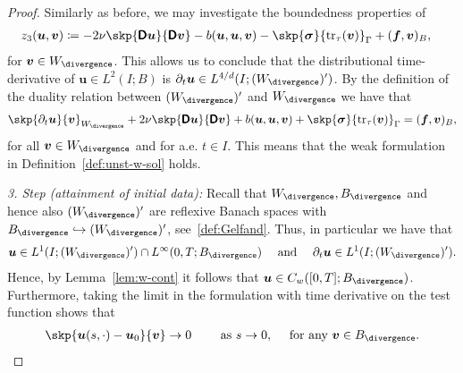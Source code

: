 \documentclass[reqno,a4paper]{amsart}
\def\tens#1{\pmb{\mathsf{#1}}}
\def\vec#1{\boldsymbol{#1}}
\def\tr{\mathop{\mathrm{tr}}\nolimits}
\def\Bdiv{{B_{\divergence}}}
\def\Wdiv{{W_{\divergence}}}
\def\bf{\vec{f}}
\def\bu{\vec{u}}
\def\bv{\vec{v}}
\def\bsigma{\vec{\sigma}}
\def\BD{\tens{D}}
\def\yz{{z_3}}
\begin{document}
\begin{proof}
	Similarly as before, we may investigate the boundedness properties of 
	\begin{equation}
		\begin{aligned}\label{def:z-form-v}
			\yz(\bu, \bv) &\coloneqq 
			- 2\nu \skp{ \BD \bu}{ \BD \bv } 
			- {b}(\bu, \bu, \bv)
			- \skp{\bsigma}{\tr_{\tau}(\bv) }_{\Gamma}
			+ ({\bf} ,{\bv} )_B,
		\end{aligned}
	\end{equation}
	for $\bv \in \Wdiv$. 
	This allows us to conclude that the distributional time-derivative  of $\bu \in L^2(I;B)$ is $\partial_t \bu \in L^{4/d}(I;(\Wdiv)')$. 
	By the definition of the duality relation between $(\Wdiv)'$ and $\Wdiv$ we have that 
	\begin{equation}\label{eq:unst-lim-weak-1}
		\begin{aligned}
			\skp{\partial_t  \bu}{ \bv}_{\Wdiv} 
			+ 2 \nu \skp{\BD \bu}{ \BD \bv}   
			+  b(\bu,\bu,\bv)  
			+  \skp{
				\bsigma
			}{\tr_\tau(\bv)}_{\Gamma}  =  ( \bf, {\bv})_B,
		\end{aligned}
	\end{equation} 
	for all $\bv \in \Wdiv$ and for a.e. $t \in I$. 
	This means that the weak formulation in Definition~\ref{def:unst-w-sol} holds. 
		
		\textit{3. Step (attainment of initial data):} 
Recall that $\Wdiv, \Bdiv$ and hence also $(\Wdiv)'$ are reflexive Banach spaces with $\Bdiv \hookrightarrow (\Wdiv)'$, see~\eqref{def:Gelfand}. 
	Thus, in particular we have that 
	\begin{align*}
		\bu \in L^1(I;(\Wdiv)')\cap L^\infty(0,T;\Bdiv) \quad \text{ and } \quad 
		\partial_t  \bu \in L^1(I;(\Wdiv)'). 
	\end{align*}
	Hence, by Lemma~\ref{lem:w-cont} it follows that $ \bu \in C_{w}([0,T];\Bdiv)$. 
	Furthermore, taking the limit in the formulation with time derivative on the test function shows that 
		\begin{align}\label{eq:ic-weak}
			\skp{\bu(s,\cdot) - \bu_0}{\bv} \to 0  \qquad \text{ as } s \to 0, \quad \text{ for any } \bv \in \Bdiv.  
		\end{align}
  

\end{proof}
\end{document}
